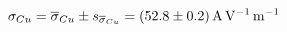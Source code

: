 
\begin{equation}
    \sigma_{Cu}
        = \overline{\sigma}_{Cu} \pm s_{\overline{\sigma}_{Cu}}
        = \SI[separate-uncertainty = true]{52.8 \pm 0.2 }{\ampere\per\volt\per\meter}
\end{equation}
